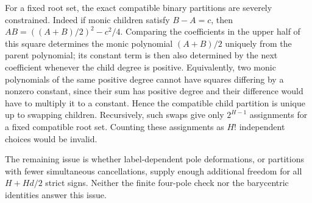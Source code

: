 \documentclass[11pt]{article}
\begin{document}
For a fixed root set, the exact compatible binary partitions are
severely constrained. Indeed if monic children satisfy $B-A=c$,
then $AB=((A+B)/2)^2-c^2/4$. Comparing the coefficients in the
upper half of this square determines the monic polynomial $(A+B)/2$
uniquely from the parent polynomial; its constant term is then also
determined by the next coefficient whenever the child degree is
positive. Equivalently, two monic polynomials of the same positive
degree cannot have squares differing by a nonzero constant, since
their sum has positive degree and their difference would have to
multiply it to a constant. Hence the compatible child partition is
unique up to swapping children. Recursively, such swaps give only
$2^{H-1}$ assignments for a fixed compatible root set. Counting
these assignments as $H!$ independent choices would be invalid.

The remaining issue is whether label-dependent pole deformations,
or partitions with fewer simultaneous cancellations, supply enough
additional freedom for all $H+Hd/2$ strict signs. Neither the finite
four-pole check nor the barycentric identities answer this issue.
\end{document}

